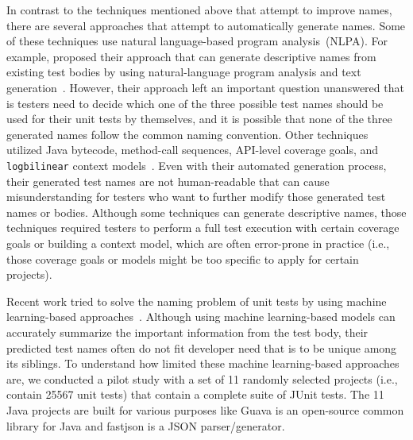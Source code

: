 In contrast to the techniques mentioned above that attempt to improve names, there are several approaches that attempt to automatically generate names.
%
Some of these techniques use natural language-based program analysis~(NLPA).
%
For example, \citeauthor{zhang2016towards} proposed their approach that can generate descriptive names from existing test bodies by using natural-language program analysis and text generation~\cite{zhang2016towards}.
%
However, their approach left an important question unanswered that is testers need to decide which one of the three possible test names should be used for their unit tests by themselves, and it is possible that none of the three generated names follow the common naming convention.
%
Other techniques utilized Java bytecode, method-call sequences, API-level coverage goals, and \texttt{logbilinear} context models~\cite{fraser2011evosuite,thummalapenta2009mseqgen,daka2017generating,allamanis2015suggesting}.
%
Even with their automated generation process, their generated test names are not human-readable that can cause misunderstanding for testers who want to further modify those generated test names or bodies.
Although some techniques can generate descriptive names, those techniques required testers to perform a full test execution with certain coverage goals or building a context model, which are often error-prone in practice (i.e., those coverage goals or models might be too specific to apply for certain projects).

Recent work tried to solve the naming problem of unit tests by using machine learning-based approaches~\cite{alon2018code2seq, alon2019code2vec}.
%
Although using machine learning-based models can accurately summarize the important information from the test body, their predicted test names often do not fit developer need that is to be unique among its siblings.
%
To understand how limited these machine learning-based approaches are, we conducted a pilot study with a set of \num{11} randomly selected projects (i.e., contain \num{25567} unit tests) that contain a complete suite of JUnit tests.
%
The \num{11} Java projects are built for various purposes like Guava is an open-source common library for Java and fastjson is a JSON parser\slash generator.


